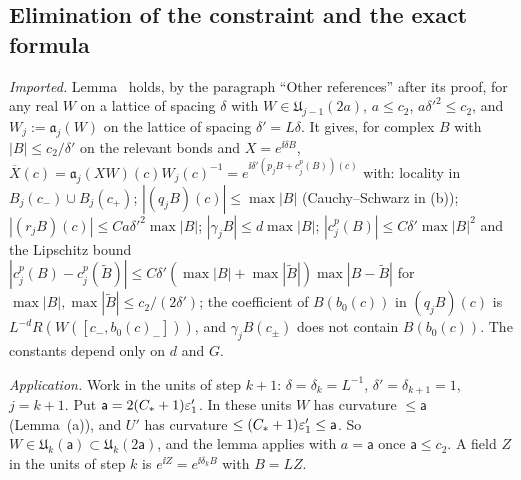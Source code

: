 \subsection{Elimination of the constraint and the exact formula}\label{d7:elim-sec}

\begin{detail}\label{d7:onestep}
\emph{Imported.} Lemma~ holds, by the paragraph ``Other references'' after its proof, for any real $W$ on a lattice of spacing $\delta$ with $W\in\mathfrak U_{j-1}(2a)$, $a\le c_2$, $a\delta'^2\le c_2$, and $W_j:=\mathfrak a_j(W)$ on the lattice of spacing $\delta'=L\delta$. It gives, for complex $B$ with $|B|\le c_2/\delta'$ on the relevant bonds and $X=e^{\ii\delta B}$, $\overline X(c)=\mathfrak a_j(XW)(c)W_j(c)^{-1}=e^{\ii\delta'(p_jB+c^p_j(B))(c)}$ with: locality in $B_j(c_-)\cup B_j(c_+)$; $|(q_jB)(c)|\le\max|B|$ (Cauchy--Schwarz in (b)); $|(r_jB)(c)|\le Ca\delta'^2\max|B|$; $|\gamma_jB|\le d\max|B|$; $|c^p_j(B)|\le C\delta'\max|B|^2$ and the Lipschitz bound $|c^p_j(B)-c^p_j(\tilde B)|\le C\delta'(\max|B|+\max|\tilde B|)\max|B-\tilde B|$ for $\max|B|,\max|\tilde B|\le c_2/(2\delta')$; the coefficient of $B(b_0(c))$ in $(q_jB)(c)$ is $L^{-d}R(W([c_-,b_0(c)_-]))$, and $\gamma_jB(c_\pm)$ does not contain $B(b_0(c))$. The constants depend only on $d$ and $G$.
\begin{step}
\emph{Application.} Work in the units of step $k+1$: $\delta=\delta_k=L^{-1}$, $\delta'=\delta_{k+1}=1$, $j=k+1$. Put $\mathsf a=2(C_*+1)\varepsilon'_1$. In these units $W$ has curvature $\le\mathsf a$ (Lemma~(a)), and $U'$ has curvature $\le(C_*+1)\varepsilon'_1\le\mathsf a$. So $W\in\mathfrak U_k(\mathsf a)\subset\mathfrak U_k(2\mathsf a)$, and the lemma applies with $a=\mathsf a$ once $\mathsf a\le c_2$. A field $Z$ in the units of step $k$ is $e^{\ii Z}=e^{\ii\delta_kB}$ with $B=LZ$.
\end{step}
\end{detail}

